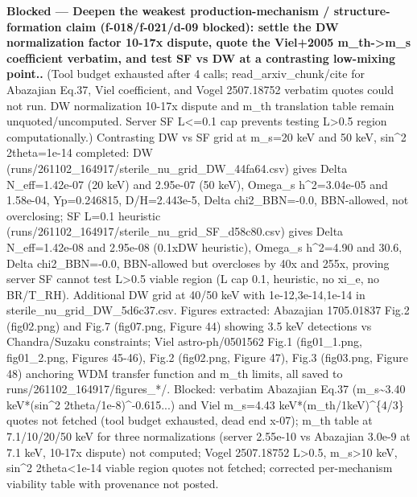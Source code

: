 \documentclass[11pt,a4paper]{article}
\begin{document}
\textbf{Blocked --- Deepen the weakest production-mechanism / structure-formation claim (f-018/f-021/d-09 blocked): settle the DW normalization factor 10-17x dispute, quote the Viel+2005 m\_th-\textgreater{}m\_s coefficient verbatim, and test SF vs DW at a contrasting low-mixing point..} (Tool budget exhausted after 4 calls; read\_arxiv\_chunk/cite for Abazajian Eq.37, Viel coefficient, and Vogel 2507.18752 verbatim quotes could not run. DW normalization 10-17x dispute and m\_th translation table remain unquoted/uncomputed. Server SF L\textless{}=0.1 cap prevents testing L\textgreater{}0.5 region computationally.) Contrasting DW vs SF grid at m\_s=20 keV and 50 keV, sin\textasciicircum{}2 2theta=1e-14 completed: DW (runs/261102\_164917/sterile\_nu\_grid\_DW\_44fa64.csv) gives Delta N\_eff=1.42e-07 (20 keV) and 2.95e-07 (50 keV), Omega\_s h\textasciicircum{}2=3.04e-05 and 1.58e-04, Yp=0.246815, D/H=2.443e-5, Delta chi2\_BBN=-0.0, BBN-allowed, not overclosing; SF L=0.1 heuristic (runs/261102\_164917/sterile\_nu\_grid\_SF\_d58c80.csv) gives Delta N\_eff=1.42e-08 and 2.95e-08 (0.1xDW heuristic), Omega\_s h\textasciicircum{}2=4.90 and 30.6, Delta chi2\_BBN=-0.0, BBN-allowed but overcloses by 40x and 255x, proving server SF cannot test L\textgreater{}0.5 viable region (L cap 0.1, heuristic, no xi\_e, no BR/T\_RH). Additional DW grid at 40/50 keV with 1e-12,3e-14,1e-14 in sterile\_nu\_grid\_DW\_5d6c37.csv. Figures extracted: Abazajian 1705.01837 Fig.2 (fig02.png) and Fig.7 (fig07.png, Figure 44) showing 3.5 keV detections vs Chandra/Suzaku constraints; Viel astro-ph/0501562 Fig.1 (fig01\_1.png, fig01\_2.png, Figures 45-46), Fig.2 (fig02.png, Figure 47), Fig.3 (fig03.png, Figure 48) anchoring WDM transfer function and m\_th limits, all saved to runs/261102\_164917/figures\_*/. Blocked: verbatim Abazajian Eq.37 (m\_s\textasciitilde{}3.40 keV*(sin\textasciicircum{}2 2theta/1e-8)\textasciicircum{}-0.615...) and Viel m\_s=4.43 keV*(m\_th/1keV)\textasciicircum{}\{4/3\} quotes not fetched (tool budget exhausted, dead end x-07); m\_th table at 7.1/10/20/50 keV for three normalizations (server 2.55e-10 vs Abazajian 3.0e-9 at 7.1 keV, 10-17x dispute) not computed; Vogel 2507.18752 L\textgreater{}0.5, m\_s\textgreater{}10 keV, sin\textasciicircum{}2 2theta\textless{}1e-14 viable region quotes not fetched; corrected per-mechanism viability table with provenance not posted.
\end{document}
